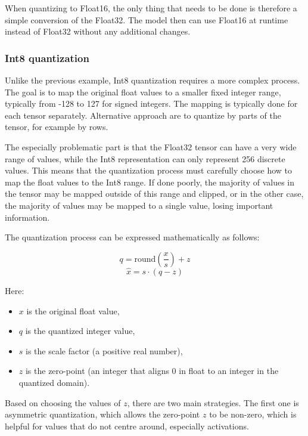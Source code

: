 When quantizing to Float16, the only thing that needs to be done is therefore a simple conversion of the Float32. The model then can use Float16 at runtime instead of Float32 without any additional changes.

\subsubsection*{Int8 quantization}

Unlike the previous example, Int8 quantization requires a more complex process. The goal is to map the original float values to a smaller fixed integer range, typically from -128 to 127 for signed integers. The mapping is typically done for each tensor separately. Alternative approach are to quantize by parts of the tensor, for example by rows.

The especially problematic part is that the Float32 tensor can have a very wide range of values, while the Int8 representation can only represent 256 discrete values. This means that the quantization process must carefully choose how to map the float values to the Int8 range. If done poorly, the majority of values in the tensor may be mapped outside of this range and clipped, or in the other case, the majority of values may be mapped to a single value, losing important information.

The quantization process can be expressed mathematically as follows:

\begin{equation}
    q = \text{round}\left(\frac{x}{s}\right) + z
    \label{eq:quantize}
\end{equation}
\begin{equation}
    \hat{x} = s \cdot (q - z)
    \label{eq:dequantize}
\end{equation}

Here:
\begin{itemize}
    \item $x$ is the original float value,
    \item $q$ is the quantized integer value,
    \item $s$ is the scale factor (a positive real number),
    \item $z$ is the zero-point (an integer that aligns 0 in float to an integer in the quantized domain).
\end{itemize}

Based on choosing the values of $z$, there are two main strategies. The first one is asymmetric quantization, which allows the zero-point $z$ to be non-zero, which is helpful for values that do not centre around, especially activations.

